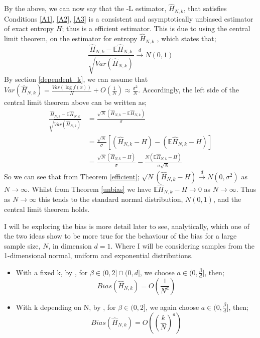 \documentclass[12pt]{report}
\begin{document}
By the above, we can now say that the -L estimator, $\hat{H}_{N, k}$, that satisfies Conditions \ref{A1}, \ref{A2}, \ref{A3} is a consistent and asymptotically unbiased estimator of exact entropy $H$; thus is a efficient estimator. This is due to using the central limit theorem, on the estimator for entropy $\hat{H}_{N, k}$ \cite{paper6}, which states that;
\begin{equation}
\frac{\hat{H}_{N, k} - \mathbb{E}{\hat{H}_{N, k}}}{\sqrt{Var(\hat{H}_{N, k})}} \xrightarrow{d} N(0, 1) \nonumber
\end{equation}
By section \ref{dependent_k}, we can assume that $Var(\hat{H}_{N, k}) = \frac{Var(\log f(x))}{N} + O(\frac{1}{N}) \approx \frac{\sigma^2}{N}$. Accordingly, the left side of the central limit theorem above can be written as;
\begin{align*}
\frac{\hat{H}_{N, k} - \mathbb{E}{\hat{H}_{N, k}}}{\sqrt{Var(\hat{H}_{N, k})}} &= \frac{\sqrt{N}(\hat{H}_{N, k} - \mathbb{E}{\hat{H}_{N, k}})}{\sigma} \\
&= \frac{\sqrt{N}}{\sigma}[(\hat{H}_{N, k} - H) - (\mathbb{E}{\hat{H}_{N, k}} - H)] \\
&= \frac{\sqrt{N}(\hat{H}_{N, k} - H)}{\sigma} - \frac{N(\mathbb{E}{\hat{H}_{N, k}} - H)}{\sigma \sqrt{N}}
\end{align*}
So we can see that from Theorem \ref{efficient}; $\sqrt{N}(\hat{H}_{N, k} - H) \xrightarrow{d} N(0, \sigma^2)$ as $N \to \infty$. Whilst from Theorem \ref{unbias} we have $\mathbb{E}{\hat{H}_{N, k}} - H  \to 0$ as $N \to \infty$. Thus as $N \to \infty$ this tends to the standard normal distribution, $N(0, 1)$, and the central limit theorem holds.

I will be exploring the bias is more detail later to see, analytically, which one of the two ideas show to be more true for the behaviour of the bias for a large sample size, $N$, in dimension $d=1$. Where I will be considering samples from the 1-dimensional normal, uniform and exponential distributions. 
\begin{itemize}
\item With a fixed k, by \cite{paper3}, for $\beta \in (0, 2] \cap (0, d]$, we choose $a \in (0, \frac{\beta}{d} ]$, then;
\begin{equation} \label{fixedkbias}
Bias(\hat{H}_{N, k})= O \left( \frac{1}{N^{a}} \right)
\end{equation}

\item With k depending on N, by \cite{paper4}, for $\beta \in (0, 2]$, we again choose $a \in (0, \frac{\beta}{d} ]$, then;
 \begin{equation} \label{dependentkbias}
Bias(\hat{H}_{N, k}) = O\left( \left( \frac{k}{N} \right)^{a} \right)
\end{equation}
\end{itemize}
\end{document}
